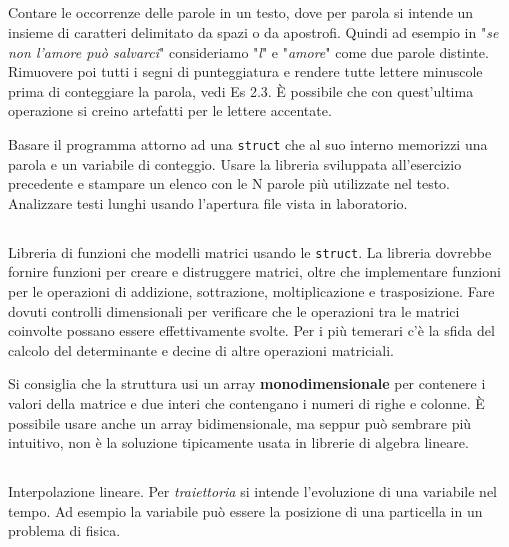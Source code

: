 \documentclass{article}
\begin{document}
\subsection{}
Contare le occorrenze delle parole in un testo, dove per parola si intende un insieme di caratteri delimitato da spazi o da apostrofi. Quindi ad esempio in "\textit{se non l'amore può salvarci}" consideriamo "\textit{l}" e "\textit{amore}" come due parole distinte. Rimuovere poi tutti i segni di punteggiatura e rendere tutte lettere minuscole prima di conteggiare la parola, vedi Es 2.3. È possibile che con quest'ultima operazione si creino artefatti per le lettere accentate.

\begin{info}
Basare il programma attorno ad una \texttt{struct} che al suo interno memorizzi una parola e un variabile di conteggio. Usare la libreria sviluppata all'esercizio precedente e stampare un elenco con le N parole più utilizzate nel testo. Analizzare testi lunghi usando l'apertura file vista in laboratorio.
\end{info}

\clearpage

\subsection{}
Libreria di funzioni che modelli matrici usando le \texttt{struct}. La libreria dovrebbe fornire funzioni per creare e distruggere matrici, oltre che implementare funzioni per le operazioni di addizione, sottrazione, moltiplicazione e trasposizione. Fare dovuti controlli dimensionali per verificare che le operazioni tra le matrici coinvolte possano essere effettivamente svolte. Per i più temerari c'è la sfida del calcolo del determinante e decine di altre operazioni matriciali. 

\begin{info}
	Si consiglia che la struttura usi un array \textbf{monodimensionale} per contenere i valori della matrice e due interi che contengano i numeri di righe e colonne. È possibile usare anche un array bidimensionale, ma seppur può sembrare più intuitivo, non è la soluzione tipicamente usata in librerie di algebra lineare. 
\end{info}


\subsection{}
Interpolazione lineare. Per \textit{traiettoria} si intende l'evoluzione di una variabile nel tempo. Ad esempio la variabile può essere la posizione di una particella in un problema di fisica. 
\end{document}
